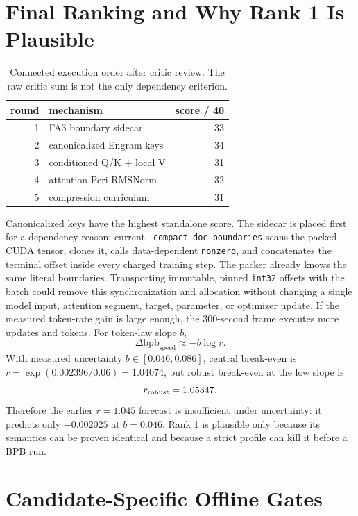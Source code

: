 \documentclass{article}
\newcommand{\bpb}{\mathrm{bpb}}
\begin{document}
\section{Final Ranking and Why Rank 1 Is Plausible}

\begin{table}[t]
\caption{Connected execution order after critic review.  The raw critic sum is
not the only dependency criterion.}
\label{tab:finalrank}
\centering\small
\begin{tabular}{r l r}
\toprule
round & mechanism & score / 40\\
\midrule
1 & FA3 boundary sidecar & 33\\
2 & canonicalized Engram keys & 34\\
3 & conditioned Q/K + local V & 31\\
4 & attention Peri-RMSNorm & 32\\
5 & compression curriculum & 31\\
\bottomrule
\end{tabular}
\end{table}

Canonicalized keys have the highest standalone score.  The sidecar is placed
first for a dependency reason: current \texttt{\_compact\_doc\_boundaries}
scans the packed CUDA tensor, clones it, calls data-dependent
\texttt{nonzero}, and concatenates the terminal offset inside every charged
training step.  The packer already knows the same literal boundaries.
Transporting immutable, pinned \texttt{int32} offsets with the batch could
remove this synchronization and allocation without changing a single model
input, attention segment, target, parameter, or optimizer update.  If the
measured token-rate gain is large enough, the 300-second frame executes more
updates and tokens.  For token-law slope $b$,
\[
\Delta\bpb_{\mathrm{speed}}\approx-b\log r.
\]
With measured uncertainty $b\in[0.046,0.086]$, central break-even is
$r=\exp(0.002396/0.06)=1.04074$, but robust break-even at the low slope is
\[
                     r_{\rm robust}=1.05347.
\]
Therefore the earlier $r=1.045$ forecast is insufficient under uncertainty:
it predicts only $-0.002025$ at $b=0.046$.  Rank 1 is plausible only because
its semantics can be proven identical and because a strict profile can kill
it before a BPB run.

\section{Candidate-Specific Offline Gates}
\end{document}
